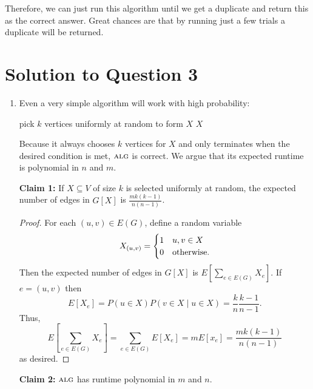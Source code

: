 \documentclass[11pt]{article}
\newcommand{\alg}{\textsc{alg}}
\begin{document}
\noindent Therefore, we can just run this algorithm until we get a duplicate and return this as the correct answer.
Great chances are that by running just a few trials a duplicate will be returned.

\newpage

\section{Solution to Question 3}

\begin{enumerate}[(1)]
  \item Even a very simple algorithm will work with high probability:

    \begin{algorithm}
      \begin{algorithmic}
        \Loop
          \State pick $k$ vertices uniformly at random to form $X$
            \State \Return $X$
          \EndIf
        \EndLoop
        \EndFunction
      \end{algorithmic}
    \end{algorithm}

    Because it always chooses $k$ vertices for $X$ and only terminates when the desired condition is met, $\alg$ is correct.
    We argue that its expected runtime is polynomial in $n$ and $m$.

    {\bf Claim 1:} If $X \subseteq V$ of size $k$ is selected uniformly at random, the expected number of edges in $G[X]$ is $\frac{mk(k-1)}{n(n-1)}$.

    \begin{proof}
      For each $(u,v) \in E(G)$, define a random variable \[X_{(u,v)} = \begin{cases}1 & u, v \in X\\ 0 & \textnormal{otherwise}.\end{cases}\]
      Then the expected number of edges in $G[X]$ is $E\left[\sum_{e \in E(G)}X_e\right]$.
      If $e = (u,v)$ then \[E[X_e] = P(u \in X) P(v \in X \mid u \in X) = \frac{k}{n}\frac{k-1}{n-1}.\]
      Thus, \[E\left[\sum_{e \in E(G)}X_e\right] = \sum_{e \in E(G)} E[X_e] = mE[x_e] = \frac{mk(k-1)}{n(n-1)}\] as desired.
    \end{proof}

    {\bf Claim 2:} $\alg$ has runtime polynomial in $m$ and $n$.


\end{enumerate}
\end{document}
